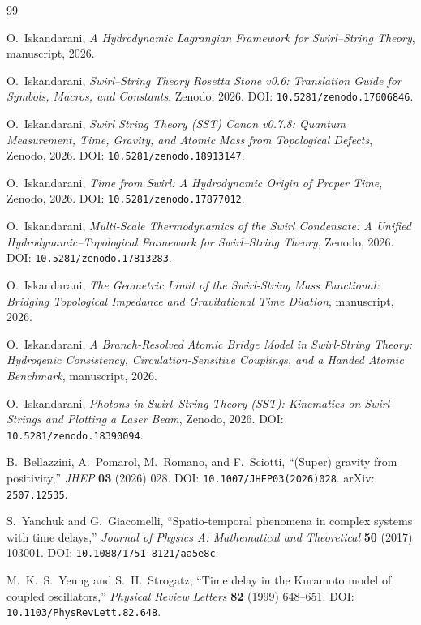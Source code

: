\documentclass[11pt]{article}
\theoremstyle{definition}
\theoremstyle{plain}
\begin{document}
\begin{thebibliography}{99}

O.~Iskandarani,
\emph{A Hydrodynamic Lagrangian Framework for Swirl--String Theory},
manuscript, 2026.

O.~Iskandarani,
\emph{Swirl--String Theory Rosetta Stone v0.6: Translation Guide for Symbols, Macros, and Constants},
Zenodo, 2026.
DOI: \texttt{10.5281/zenodo.17606846}.

O.~Iskandarani,
\emph{Swirl String Theory (SST) Canon v0.7.8: Quantum Measurement, Time, Gravity, and Atomic Mass from Topological Defects},
Zenodo, 2026.
DOI: \texttt{10.5281/zenodo.18913147}.

O.~Iskandarani,
\emph{Time from Swirl: A Hydrodynamic Origin of Proper Time},
Zenodo, 2026.
DOI: \texttt{10.5281/zenodo.17877012}.

O.~Iskandarani,
\emph{Multi-Scale Thermodynamics of the Swirl Condensate: A Unified Hydrodynamic--Topological Framework for Swirl--String Theory},
Zenodo, 2026.
DOI: \texttt{10.5281/zenodo.17813283}.

O.~Iskandarani,
\emph{The Geometric Limit of the Swirl-String Mass Functional: Bridging Topological Impedance and Gravitational Time Dilation},
manuscript, 2026.

O.~Iskandarani,
\emph{A Branch-Resolved Atomic Bridge Model in Swirl-String Theory: Hydrogenic Consistency, Circulation-Sensitive Couplings, and a Handed Atomic Benchmark},
manuscript, 2026.

O.~Iskandarani,
\emph{Photons in Swirl--String Theory (SST): Kinematics on Swirl Strings and Plotting a Laser Beam},
Zenodo, 2026.
DOI: \texttt{10.5281/zenodo.18390094}.

B.~Bellazzini, A.~Pomarol, M.~Romano, and F.~Sciotti,
``(Super) gravity from positivity,''
\emph{JHEP} \textbf{03} (2026) 028.
DOI: \texttt{10.1007/JHEP03(2026)028}.
arXiv: \texttt{2507.12535}.

S.~Yanchuk and G.~Giacomelli,
``Spatio-temporal phenomena in complex systems with time delays,''
\emph{Journal of Physics A: Mathematical and Theoretical} \textbf{50} (2017) 103001.
DOI: \texttt{10.1088/1751-8121/aa5e8c}.

M.~K.~S.~Yeung and S.~H.~Strogatz,
``Time delay in the Kuramoto model of coupled oscillators,''
\emph{Physical Review Letters} \textbf{82} (1999) 648--651.
DOI: \texttt{10.1103/PhysRevLett.82.648}.


\end{thebibliography}
\end{document}
